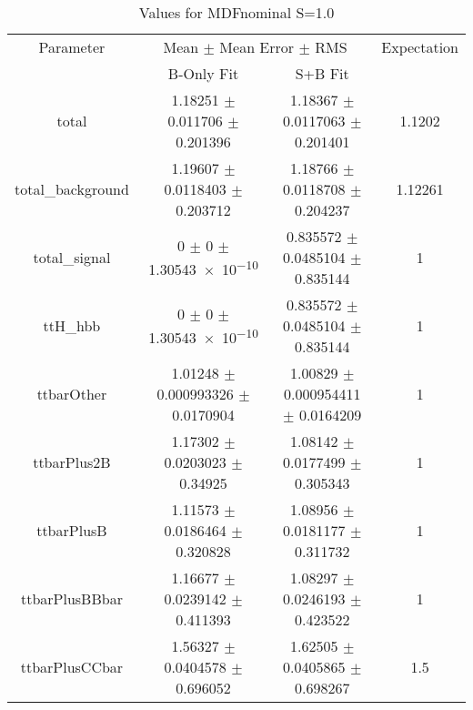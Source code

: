 \begin{table}
\centering
\caption{Values for MDFnominal S=1.0}
\begin{tabular}{cccc}
\toprule
Parameter & \multicolumn{2}{c}{Mean $\pm$ Mean Error $\pm$ RMS} & Expectation\\
 & B-Only Fit & S+B Fit & \\
\midrule
total & \num{1.18251} $\pm$ \num{0.011706} $\pm$ \num{0.201396} & \num{1.18367} $\pm$ \num{0.0117063} $\pm$ \num{0.201401} & \num{1.1202}\\
total\_background & \num{1.19607} $\pm$ \num{0.0118403} $\pm$ \num{0.203712} & \num{1.18766} $\pm$ \num{0.0118708} $\pm$ \num{0.204237} & \num{1.12261}\\
total\_signal & \num{0} $\pm$ \num{0} $\pm$ \num{1.30543e-10} & \num{0.835572} $\pm$ \num{0.0485104} $\pm$ \num{0.835144} & \num{1}\\
ttH\_hbb & \num{0} $\pm$ \num{0} $\pm$ \num{1.30543e-10} & \num{0.835572} $\pm$ \num{0.0485104} $\pm$ \num{0.835144} & \num{1}\\
ttbarOther & \num{1.01248} $\pm$ \num{0.000993326} $\pm$ \num{0.0170904} & \num{1.00829} $\pm$ \num{0.000954411} $\pm$ \num{0.0164209} & \num{1}\\
ttbarPlus2B & \num{1.17302} $\pm$ \num{0.0203023} $\pm$ \num{0.34925} & \num{1.08142} $\pm$ \num{0.0177499} $\pm$ \num{0.305343} & \num{1}\\
ttbarPlusB & \num{1.11573} $\pm$ \num{0.0186464} $\pm$ \num{0.320828} & \num{1.08956} $\pm$ \num{0.0181177} $\pm$ \num{0.311732} & \num{1}\\
ttbarPlusBBbar & \num{1.16677} $\pm$ \num{0.0239142} $\pm$ \num{0.411393} & \num{1.08297} $\pm$ \num{0.0246193} $\pm$ \num{0.423522} & \num{1}\\
ttbarPlusCCbar & \num{1.56327} $\pm$ \num{0.0404578} $\pm$ \num{0.696052} & \num{1.62505} $\pm$ \num{0.0405865} $\pm$ \num{0.698267} & \num{1.5}\\
\bottomrule
\end{tabular}
\end{table}